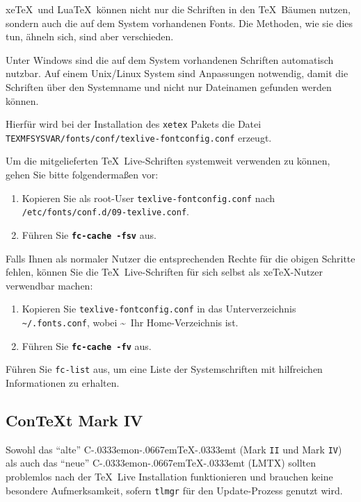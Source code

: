 \documentclass[12pt,ngerman,a4paper,fullparskip]{report}
\newcommand{\TL}{\TeX\ Live\xspace}
\newcommand{\acro}[1]{\texttt{#1}}
\newcommand{\code}[1]{\texttt{#1}}
\newcommand{\filename}[1]{\texttt{#1}}
\newcommand{\dirname}[1]{\texttt{#1}}
\newcommand{\Ucom}[1]{\textbf{\texttt{#1}}}
\newcommand\ConTeXt{C\kern-.0333emon\-\kern-.0667em\TeX\kern-.0333emt}
\providecommand*{\XeTeX}{xe\TeX\xspace}
\begin{document}
\XeTeX\  und Lua\TeX\ können nicht nur die Schriften in den \TeX\ Bäumen nutzen, sondern auch die auf dem System vorhandenen Fonts. Die Methoden, wie sie dies tun, ähneln sich, sind aber verschieden.

Unter Windows sind die auf dem System vorhandenen Schriften automatisch nutzbar. Auf einem Unix/Linux System sind Anpassungen notwendig, damit die Schriften über den Systemname und nicht nur Dateinamen gefunden werden können.

Hierfür wird bei der Installation des \filename{xetex} Pakets die Datei \newline  \filename{TEXMFSYSVAR/fonts/conf/texlive-fontconfig.conf}
erzeugt.

Um die mitgelieferten \TL-Schriften systemweit verwenden zu können,
gehen Sie bitte folgendermaßen vor:

\begin{enumerate}
\item Kopieren Sie als root-User \filename{texlive-fontconfig.conf} nach \newline
\dirname{/etc/fonts/conf.d/09-texlive.conf}.
\item Führen Sie \Ucom{fc-cache -fsv} aus. 
\end{enumerate}

\noindent Falls Ihnen als normaler Nutzer die entsprechenden Rechte für die
obigen Schritte fehlen, können Sie die \TL-Schriften für sich selbst
als \XeTeX-Nutzer verwendbar machen:

\begin{enumerate}
\item Kopieren Sie \filename{texlive-fontconfig.conf} in das Unterverzeichnis
      \filename{\textasciitilde/.fonts.conf}, wobei \textasciitilde\ Ihr Home-Verzeichnis ist.
\item Führen Sie \Ucom{fc-cache -fv} aus.
\end{enumerate}

Führen Sie \code{fc-list} aus, um eine Liste der Systemschriften mit hilfreichen Informationen zu erhalten.

\subsection{Con\TeX t Mark IV}
\label{sec:context-mkiv}

Sowohl das \enquote{alte} \ConTeXt{} (Mark \acro{II} und Mark \acro{IV}) als auch das \enquote{neue} \ConTeXt{} (LMTX) sollten problemlos nach der \TL{} Installation funktionieren und brauchen keine besondere Aufmerksamkeit, sofern \verb+tlmgr+ für den Update-Prozess genutzt wird.
\end{document}
